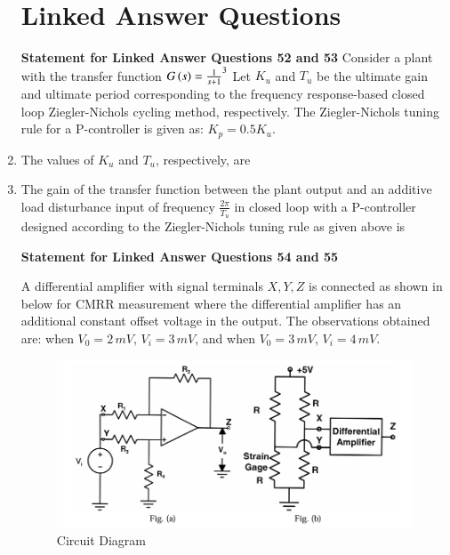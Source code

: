 \documentclass[journal,12pt,onecolumn]{IEEEtran}
\theoremstyle{remark}
\begin{document}
\begin{enumerate}
\section*{Linked Answer Questions}

\textbf{Statement for Linked Answer Questions 52 and 53}
Consider a plant with the transfer function  
$G\left(s\right) = \frac{1}{s+1}^3$ 
Let $K_u$ and $T_u$ be the ultimate gain and ultimate period corresponding to the frequency response-based closed loop Ziegler-Nichols cycling method, respectively. The Ziegler-Nichols tuning rule for a P-controller is given as:  
$K_p = 0.5 K_u.$

\item The values of $K_u$ and $T_u$, respectively, are  
\par \hfill{}
\begin{enumerate}
\end{enumerate}

\item The gain of the transfer function between the plant output and an additive load disturbance input of frequency $\frac{2 \pi}{T_u}$ in closed loop with a P-controller designed according to the Ziegler-Nichols tuning rule as given above is  
\par \hfill{}
\begin{enumerate}
\end{enumerate}

\textbf{Statement for Linked Answer Questions 54 and 55}

 A differential amplifier with signal terminals $X, Y, Z$ is connected as shown in  below for CMRR measurement where the differential amplifier has an additional constant offset voltage in the output. The observations obtained are: when $V_0 = 2\,mV$, $V_i = 3\,mV$, and when $V_0 = 3\,mV$, $V_i = 4\,mV$.  
\begin{figure}[H]
\centering
\includegraphics[width=0.6\columnwidth]{Figs/Q-54&55.png}
\caption{Circuit Diagram}
\label{54}
\end{figure}


\end{enumerate}
\end{document}
